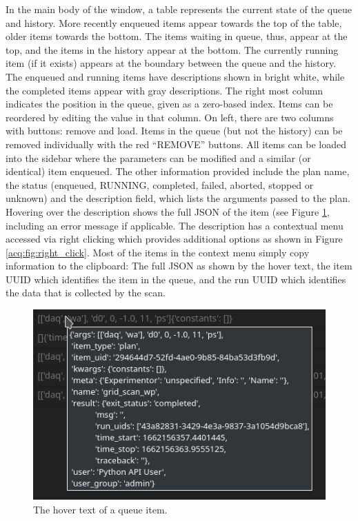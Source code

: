 In the main body of the window, a table represents the current state of the queue and history.
More recently enqueued items appear towards the top of the table, older items towards the bottom.
The items waiting in queue, thus, appear at the top, and the items in the history appear at the bottom.
The currently running item (if it exists) appears at the boundary between the queue and the history.
The enqueued and running items have descriptions shown in bright white, while the completed items appear with gray descriptions.
The right most column indicates the position in the queue, given as a zero-based index.
Items can be reordered by editing the value in that column.
On left, there are two columns with buttons: remove and load.
Items in the queue (but not the history) can be removed individually with the red ``REMOVE'' buttons.
All items can be loaded into the sidebar where the parameters can be modified and a similar (or identical) item enqueued.
The other information provided include the plan name, the status (enqueued, RUNNING, completed, failed, aborted, stopped or unknown) and the description field, which lists the arguments passed to the plan.
Hovering over the description shows the full JSON of the item (see Figure \ref{acq:fig:hover_text}, including an error message if applicable.
The description has a contextual menu accessed via right clicking which provides additional options as shown in Figure \ref{acq:fig:right_click}.
Most of the items in the context menu simply copy information to the clipboard: The full JSON as shown by the hover text, the item \Gls{UUID} which identifies the item in the queue, and the run \Gls{UUID} which identifies the data that is collected by the scan.

\begin{figure}
\includegraphics[width=5in]{"acquisition/images/hover_text"}
\caption[Queue hover text]{
	The hover text of a queue item.
}
\label{acq:fig:hover_text}
\end{figure}


